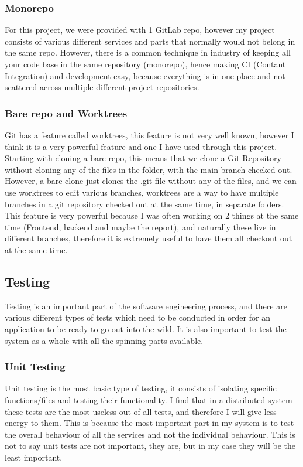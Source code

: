 \documentclass[titlepage]{article}
\begin{document}
\subsubsection{Monorepo}
For this project, we were provided with 1 GitLab repo, however my project consists of various different services and parts that normally would not belong in the same repo. However, there is a common technique in industry of keeping all your code base in the same repository (monorepo), hence making CI (Contant Integration) and development easy, because everything is in one place and not scattered across multiple different project repositories. 

\subsubsection{Bare repo and Worktrees}
Git has a feature called worktrees, this feature is not very well known, however I think it is a very powerful feature and one I have used through this project. Starting with cloning a bare repo, this means that we clone a Git Repository without cloning any of the files in the folder, with the main branch checked out. However, a bare clone just clones the .git file without any of the files, and we can use worktrees to edit various branches, worktrees are a way to have multiple branches in a git repository checked out at the same time, in separate folders. This feature is very powerful because I was often working on 2 things at the same time (Frontend, backend and maybe the report), and naturally these live in different branches, therefore it is extremely useful to have them all checkout out at the same time. 

\subsection{Testing}
Testing is an important part of the software engineering process, and there are various different types of tests which need to be conducted in order for an application to be ready to go out into the wild. It is also important to test the system as a whole with all the spinning parts available.

\subsubsection{Unit Testing}
Unit testing is the most basic type of testing, it consists of isolating specific functions/files and testing their functionality. I find that in a distributed system these tests are the most useless out of all tests, and therefore I will give less energy to them. This is because the most important part in my system is to test the overall behaviour of all the services and not the individual behaviour. This is not to say unit tests are not important, they are, but in my case they will be the least important. \\
\end{document}
